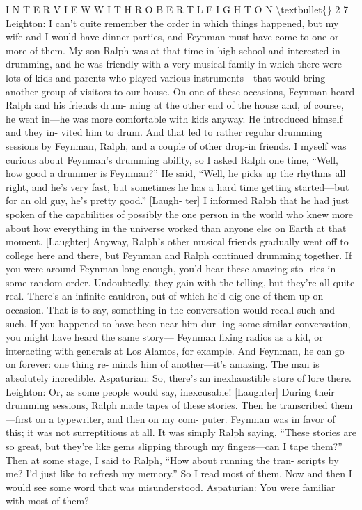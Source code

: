 \documentclass[10pt,oneside]{article}
\begin{document}
I N T E R V I E W  W I T H  R O B E R T  L E I G H T O N \textbackslash{}textbullet\{\} 2 7 Leighton: I can’t quite remember the order in which things happened, but my wife and I would have dinner parties, and Feynman must have come to one or more of them. My son Ralph was at that time in high school and interested in drumming, and he was friendly with a very musical family in which there were lots of kids and parents who played various instruments---that would bring another group of visitors to our house. On one of these occasions, Feynman heard Ralph and his friends drum- ming at the other end of the house and, of course, he went in---he was more comfortable with kids anyway. He introduced himself and they in- vited him to drum. And that led to rather regular drumming sessions by Feynman, Ralph, and a couple of other drop-in friends. I myself was curious about Feynman’s drumming ability, so I asked Ralph one time, “Well, how good a drummer is Feynman?” He said, “Well, he picks up the rhythms all right, and he’s very fast, but sometimes he has a hard time getting started---but for an old guy, he’s pretty good.” [Laugh- ter] I informed Ralph that he had just spoken of the capabilities of possibly the one person in the world who knew more about how everything in the universe worked than anyone else on Earth at that moment. [Laughter] Anyway, Ralph’s other musical friends gradually went off to college here and there, but Feynman and Ralph continued drumming together. If you were around Feynman long enough, you’d hear these amazing sto- ries in some random order. Undoubtedly, they gain with the telling, but they’re all quite real. There’s an infinite cauldron, out of which he’d dig one of them up on occasion. That is to say, something in the conversation would recall such-and-such. If you happened to have been near him dur- ing some similar conversation, you might have heard the same story--- Feynman fixing radios as a kid, or interacting with generals at Los Alamos, for example. And Feynman, he can go on forever: one thing re- minds him of another---it’s amazing. The man is absolutely incredible. Aspaturian: So, there’s an inexhaustible store of lore there. Leighton: Or, as some people would say, inexcusable! [Laughter] During their drumming sessions, Ralph made tapes of these stories. Then he transcribed them---first on a typewriter, and then on my com- puter. Feynman was in favor of this; it was not surreptitious at all. It was simply Ralph saying, “These stories are so great, but they’re like gems slipping through my fingers---can I tape them?” Then at some stage, I said to Ralph, “How about running the tran- scripts by me? I’d just like to refresh my memory.” So I read most of them. Now and then I would see some word that was misunderstood. Aspaturian: You were familiar with most of them?\par
\end{document}
